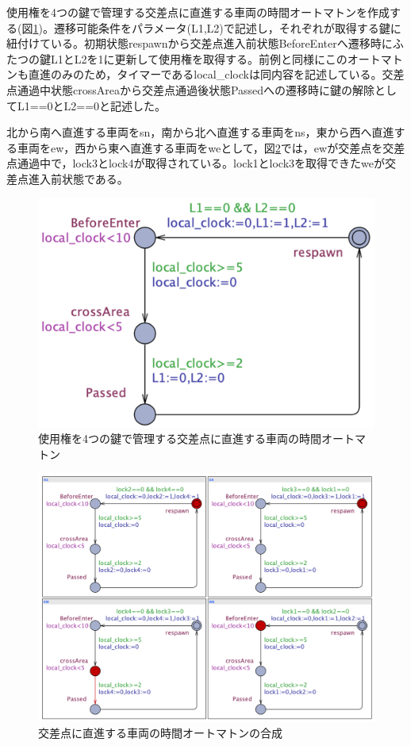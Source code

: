 \documentclass{tpu-sotu}
\begin{document}
	使用権を4つの鍵で管理する交差点に直進する車両の時間オートマトンを作成する(図\ref{news})。遷移可能条件をパラメータ(L1,L2)で記述し，それぞれが取得する鍵に紐付けている。初期状態respawnから交差点進入前状態BeforeEnterへ遷移時にふたつの鍵L1とL2を1に更新して使用権を取得する。前例と同様にこのオートマトンも直進のみのため，タイマーであるlocal\_clockは同内容を記述している。交差点通過中状態crossAreaから交差点通過後状態Passedへの遷移時に鍵の解除としてL1==0とL2==0と記述した。
	
	北から南へ直進する車両をsn，南から北へ直進する車両をns，東から西へ直進する車両をew，西から東へ直進する車両をweとして，図\ref{newsS}では，ewが交差点を交差点通過中で，lock3とlock4が取得されている。lock1とlock3を取得できたweが交差点進入前状態である。
	\begin{figure}[htbp]
	\centering
	\includegraphics[width=130mm]{news.png}
	\caption{使用権を4つの鍵で管理する交差点に直進する車両の時間オートマトン}
	\label{news}
	\end{figure}
	\begin{figure}[htbp]
	\centering
	\includegraphics[width=130mm]{newsSimu.png}
	\caption{交差点に直進する車両の時間オートマトンの合成}
	\label{newsS}
	\end{figure}
	
\end{document}
